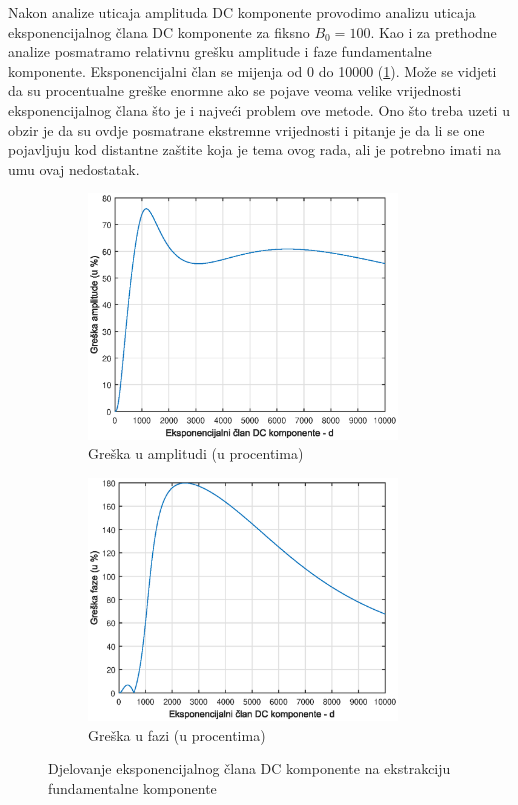 Nakon analize uticaja amplituda DC komponente provodimo analizu uticaja eksponencijalnog člana DC komponente za fiksno $B_0 = 100$. Kao i za prethodne analize posmatramo relativnu grešku amplitude i faze fundamentalne komponente. Eksponencijalni član se mijenja od 0 do 10000 (\ref{fig:56}). Može se vidjeti da su procentualne greške enormne ako se pojave veoma velike vrijednosti eksponencijalnog člana što je i najveći problem ove metode. Ono što treba uzeti u obzir je da su ovdje posmatrane ekstremne vrijednosti i pitanje je da li se one pojavljuju kod distantne zaštite koja je tema ovog rada, ali je potrebno imati na umu ovaj nedostatak. 

\begin{figure}[H]
    \centering
    \begin{subfigure}{0.45\textwidth}
        \centering
        \includegraphics[width=0.9\textwidth]{Slike_rezultati/Test_dc3.eps} %
        \caption{Greška u amplitudi (u procentima)}
    \end{subfigure}\hfill
    \begin{subfigure}{0.45\textwidth}
        \centering
        \includegraphics[width=0.9\textwidth]{Slike_rezultati/Test_dc4.eps} %
        \caption{Greška u fazi (u procentima)}
    \end{subfigure}
    \caption{Djelovanje eksponencijalnog člana DC komponente na ekstrakciju fundamentalne komponente }
    \label{fig:56}
\end{figure}


